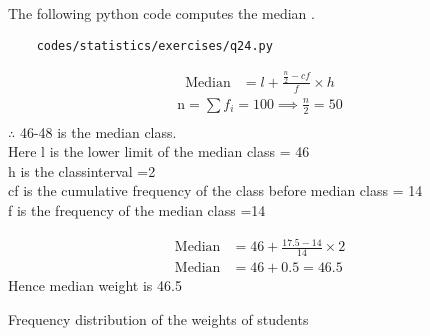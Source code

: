 The following python code computes the median .
	\begin{lstlisting}
	codes/statistics/exercises/q24.py
	\end{lstlisting}
	
	
	\begin{align}
	\text{Median} &= l + \frac{\frac{n}{2} -cf}{f}\times h
	\end{align}
	\begin{align}
	\text{n} = \sum f_{i} = 100 \implies \frac{n}{2} = 50\\
	\end{align}
	$\therefore$ 46-48 is the median class.\\
	Here l is the lower limit of the median class = 46\\
	h is the classinterval =2\\
	cf is the cumulative frequency of the class before median class = 14\\
	f is the frequency of the median class =14

	\begin{align}
	\text{Median} &= 46 + \frac{17.5 - 14}{14}\times 2\\
	\text{Median} &= 46 + 0.5 = 46.5
	\end{align}
	Hence median weight is 46.5
	\begin{table}[ht]
	\begin{center}
    	
	\caption{Frequency distribution of the weights of students}
	\label{table:stat_ex_q24_anstable10}
	\end{center}
	\end{table}

